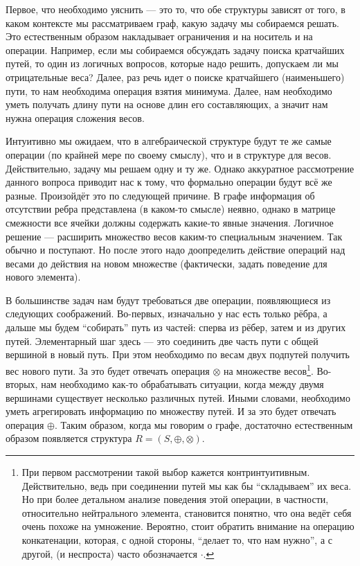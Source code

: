 Первое, что необходимо уяснить --- это то, что обе структуры зависят от того, в каком контексте мы рассматриваем граф, какую задачу мы собираемся решать. Это естественным образом накладывает ограничения и на носитель и на операции. Например, если мы собираемся обсуждать задачу поиска кратчайших путей, то один из логичных вопросов, которые надо решить, допускаем ли мы отрицательные веса? Далее, раз речь идет о поиске кратчайшего (наименьшего) пути, то нам необходима операция взятия минимума. Далее, нам необходимо уметь получать длину пути на основе длин его составляющих, а значит нам нужна операция сложения весов.

Интуитивно мы ожидаем, что в алгебраической структуре будут те же самые операции (по крайней мере по своему смыслу), что и в структуре для весов. Действительно, задачу мы решаем одну и ту же. Однако аккуратное рассмотрение данного вопроса приводит нас к тому, что формально операции будут всё же разные. Произойдёт это по следующей причине. В графе информация об отсутствии ребра представлена (в каком-то смысле) неявно, однако в матрице смежности все ячейки должны содержать какие-то явные значения. Логичное решение --- расширить множество весов каким-то специальным значением. Так обычно и поступают. Но после этого надо доопределить действие операций над весами до действия на новом множестве (фактически, задать поведение для нового элемента).

В большинстве задач нам будут требоваться две операции, появляющиеся из следующих соображений. Во-первых, изначально у нас есть только рёбра, а дальше мы будем ``собирать'' путь из частей: сперва из рёбер, затем и из других путей. Элементарный шаг здесь --- это соединить две часть пути с общей вершиной в новый путь. При этом необходимо по весам двух подпутей получить вес нового пути. За это будет отвечать операция $\otimes$ на множестве весов\footnote{При первом рассмотрении такой выбор кажется контринтуитивным. Действительно, ведь при соединении путей мы как бы ``складываем'' их веса. Но при более детальном анализе поведения этой операции, в частности, относительно нейтрального элемента, становится понятно, что она ведёт себя очень похоже на умножение. Вероятно, стоит обратить внимание на операцию конкатенации, которая, с одной стороны, ``делает то, что нам нужно'', а с другой, (и неспроста) часто обозначается $\cdot$.}. Во-вторых, нам необходимо как-то обрабатывать ситуации, когда между двумя вершинами существует несколько различных путей. Иными словами, необходимо уметь агрегировать информацию по множеству путей. И за это будет отвечать операция $\oplus$. Таким образом, когда мы говорим о графе, достаточно естественным образом появляется структура $R=(S,\oplus,\otimes)$.

